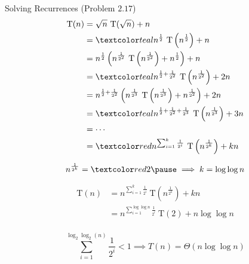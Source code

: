 % 
% 
% 
% 
% 

\begin{frame}{}
  \begin{exampleblock}{Solving Recurrences (Problem $2.17$)}
    \begin{align*} 
      \text{T}(n) &= \sqrt{n}\ \text{T}(\sqrt{n})+n \\
	&= \teal{n^{\frac{1}{2}}\ \text{T}\left(n^{\frac{1}{2}} \right)+n} \\
	&= n^{\frac{1}{2}}\left( n^{\frac{1}{2^2}}\ \text{T}\left(n^{\frac{1}{2^2}} \right) + n^{\frac{1}{2}} \right)+n\\
	&= \teal{n^{\frac{1}{2}+\frac{1}{2^2}}\ \text{T}\left(n^{\frac{1}{2^2}}\right) + 2n} \\
	&= n^{\frac{1}{2}+\frac{1}{2^2}}\left(n^{\frac{1}{2^3}}\ \text{T}\left(n^{\frac{1}{2^3}}\right) + n^{\frac{1}{2^2}} \right) + 2n\\
	&= \teal{n^{\frac{1}{2}+\frac{1}{2^2}+\frac{1}{2^3}}\ \text{T}\left(n^{\frac{1}{2^3}}\right) + 3n} \\ 
	&= \cdots \\ 
	&= \red{n^{\sum_{i=1}^{k}\frac{1}{2^i}}\ \text{T}\left(n^{\frac{1}{2^k}}\right) + kn} \\ 
    \end{align*}
  \end{exampleblock}
\end{frame}

\begin{frame}{}
  \[
    n^{\frac{1}{2^k}} = \red{2} \pause \implies k = \log\log n
  \]

  \pause
  \begin{align*} 
    \text{T}(n) &= n^{\sum_{i=1}^{k}\frac{1}{2^i}}\ \text{T}\left(n^{\frac{1}{2^k}}\right ) +kn\\ 
	    &=n^{\sum_{i=1}^{\log\log n}\frac{1}{2^i}}\ \text{T}(2) + n \log\log n\\ 
  \end{align*}

  \pause
  \[
    \sum_{i=1}^{\log_2\log_2(n)}\frac{1}{2^i} < 1 \implies T(n) = \Theta(n \log \log n)
  \]

  \pause
  \vspace{0.30cm}
  \centerline{}
\end{frame}

